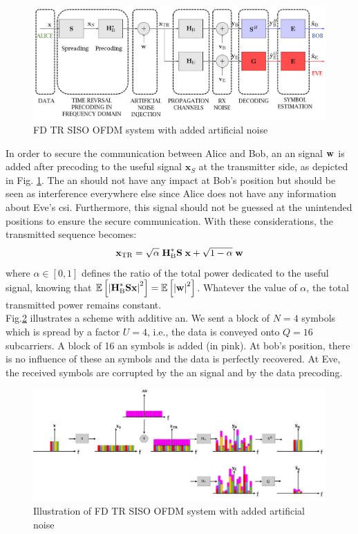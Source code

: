 \begin{figure}[htb!]
    \centering
    \includegraphics[width=1\linewidth]{img/Capture2.PNG}
    \caption{FD TR SISO OFDM system with added artificial noise}
    \label{fig:TR_FD_AN}
\end{figure} 
In order to secure the communication between Alice and Bob, an \gls{an} signal $\textbf{w}$ is added after precoding to the useful signal $\textbf{x}_S$ at the transmitter side, as depicted in Fig. \ref{fig:TR_FD_AN}. The \gls{an} should not have any impact at Bob's position but should be seen as interference everywhere else since Alice does not have any information about Eve's \gls{csi}. Furthermore, this signal should not be guessed at the unintended positions to ensure the secure communication. With these considerations, the transmitted sequence becomes:
\begin{equation}
    \textbf{x}_{\text{TR}} = \sqrt{\alpha} \;\textbf{H}_{\text{B}}^*  \textbf{S}\; \textbf{x} +  \sqrt{1-\alpha} \; \textbf{w}
    \label{eq:sym_rad_AN}
\end{equation} 
where $\alpha \in [0,1]$ defines the ratio of the total power dedicated to the useful signal, knowing that $\mathbb{E} \left[\left|\textbf{H}_{\text{B}}^*\textbf{S}\textbf{x}\right|^2\right] = \mathbb{E} \left[\left|\textbf{w}\right|^2\right]$. Whatever the value of $\alpha$, the total transmitted power remains constant.\\

Fig.\ref{fig:AN_illustration} illustrates a scheme with additive \gls{an}. We sent a block of $N=4$ symbols which is spread by a factor $U=4$, i.e., the data is conveyed onto $Q=16$ subcarriers. A block of 16 \gls{an} symbols is added (in pink). At bob's position, there is no influence of these \gls{an} symbols and the data is perfectly recovered. At Eve, the received symbols are corrupted by the \gls{an} signal and by the data precoding.
\begin{figure}[h!]
    \centering
    \includegraphics[width=1\linewidth]{img/scheme_AN_illustration.png}
    \caption{Illustration of FD TR SISO OFDM system with added artificial noise}
    \label{fig:AN_illustration}
\end{figure} 

